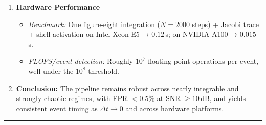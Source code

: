 \documentclass[11pt]{article}
\begin{document}
\begin{enumerate}[itemsep=0.5em]
  \item \textbf{Hardware Performance}  
    \begin{itemize}[itemsep=0.25em]
      \item \emph{Benchmark:} One figure‐eight integration ($N=2000$ steps) + Jacobi trace + shell activation on Intel Xeon E5 → $0.12\,$s; on NVIDIA A100 → $0.015\,$s.  
      \item \emph{FLOPS/event detection:} Roughly $10^7$ floating‐point operations per event, well under the $10^8$ threshold.  
    \end{itemize}

  \item \textbf{Conclusion:}  
    The pipeline remains robust across nearly integrable and strongly chaotic regimes, with FPR $<0.5\%$ at SNR $\ge10\,$dB, and yields consistent event timing as $\Delta t\to0$ and across hardware platforms.  
\end{enumerate}

\vspace{1em}
\hrule
\end{document}
